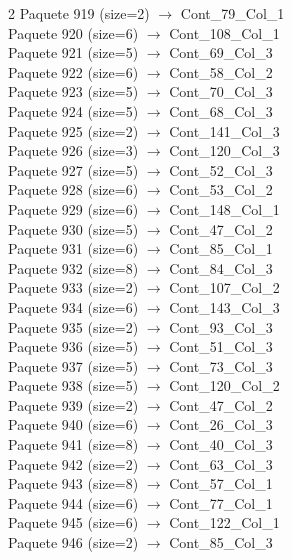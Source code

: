 \begin{multicols}{2}
Paquete 919 (size=2) $\rightarrow$ Cont\_79\_Col\_1\\
Paquete 920 (size=6) $\rightarrow$ Cont\_108\_Col\_1\\
Paquete 921 (size=5) $\rightarrow$ Cont\_69\_Col\_3\\
Paquete 922 (size=6) $\rightarrow$ Cont\_58\_Col\_2\\
Paquete 923 (size=5) $\rightarrow$ Cont\_70\_Col\_3\\
Paquete 924 (size=5) $\rightarrow$ Cont\_68\_Col\_3\\
Paquete 925 (size=2) $\rightarrow$ Cont\_141\_Col\_3\\
Paquete 926 (size=3) $\rightarrow$ Cont\_120\_Col\_3\\
Paquete 927 (size=5) $\rightarrow$ Cont\_52\_Col\_3\\
Paquete 928 (size=6) $\rightarrow$ Cont\_53\_Col\_2\\
Paquete 929 (size=6) $\rightarrow$ Cont\_148\_Col\_1\\
Paquete 930 (size=5) $\rightarrow$ Cont\_47\_Col\_2\\
Paquete 931 (size=6) $\rightarrow$ Cont\_85\_Col\_1\\
Paquete 932 (size=8) $\rightarrow$ Cont\_84\_Col\_3\\
Paquete 933 (size=2) $\rightarrow$ Cont\_107\_Col\_2\\
Paquete 934 (size=6) $\rightarrow$ Cont\_143\_Col\_3\\
Paquete 935 (size=2) $\rightarrow$ Cont\_93\_Col\_3\\
Paquete 936 (size=5) $\rightarrow$ Cont\_51\_Col\_3\\
Paquete 937 (size=5) $\rightarrow$ Cont\_73\_Col\_3\\
Paquete 938 (size=5) $\rightarrow$ Cont\_120\_Col\_2\\
Paquete 939 (size=2) $\rightarrow$ Cont\_47\_Col\_2\\
Paquete 940 (size=6) $\rightarrow$ Cont\_26\_Col\_3\\
Paquete 941 (size=8) $\rightarrow$ Cont\_40\_Col\_3\\
Paquete 942 (size=2) $\rightarrow$ Cont\_63\_Col\_3\\
Paquete 943 (size=8) $\rightarrow$ Cont\_57\_Col\_1\\
Paquete 944 (size=6) $\rightarrow$ Cont\_77\_Col\_1\\
Paquete 945 (size=6) $\rightarrow$ Cont\_122\_Col\_1\\
Paquete 946 (size=2) $\rightarrow$ Cont\_85\_Col\_3\\

\end{multicols}
